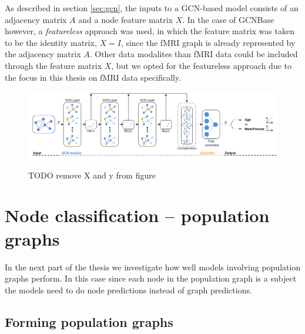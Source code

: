 As described in section \ref{sec:gcn}, the inputs to a GCN-based model consists of an adjacency matrix $A$ and a node feature matrix $X$. In the case of GCNBase however, a \textit{featureless} approach was used, in which the feature matrix was taken to be the identity matrix, $X=I$, since the fMRI graph is already represented by the adjacency matrix $A$. Other data modalites than fMRI data could be included through the feature matrix $X$, but we opted for the featureless approach due to the focus in this thesis on fMRI data specifically.

%         

\begin{figure}[H]
    \centering
    \includegraphics[width=\textwidth]{chapters/images_methods/base_v2.png}
    \caption{TODO remove X and y from figure}
    \label{fig:gcn_base}
\end{figure}


\section{Node classification -- population graphs}
In the next part of the thesis we investigate how well models involving population graphs perform. In this case since each node in the population graph is a subject the models need to do node predictions instead of graph predictions. 

\subsection{Forming population graphs}

